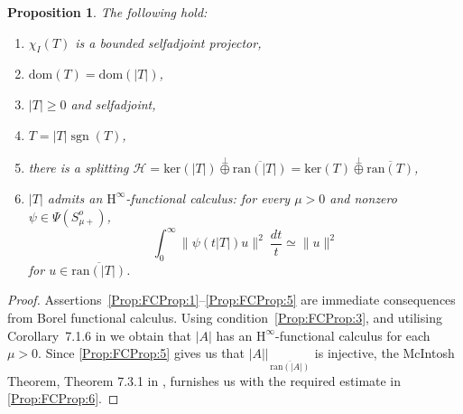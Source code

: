\documentclass[a4paper,10pt,reqno]{amsart}
\newcommand{\rest}[1]{{{\lvert_{}}_{}}_{#1}}
\newcommand{\modulus}[1]{|#1|}
\newcommand{\norm}[1]{\| #1 \|}%
\newcommand{\Hil}{\mathscr{H}}
\newcommand{\nul}{\mathrm{ker}}
\newcommand{\ran}{\mathrm{ran}}
\newcommand{\dom}{\mathrm{dom}}
\newcommand{\close}[1]{\overline{#1}}
\DeclareMathOperator{\sgn}{sgn}%
\newcommand{\Hinfty}{$\mathrm{H}^\infty$}
\newtheorem{proposition}[theorem]{Proposition}
\theoremstyle{definition}
\begin{document}
\begin{proposition}
\label{Prop:FCProp}
The following hold:
\begin{enumerate}[label=(\roman*), labelwidth=0pt, labelindent=2pt, leftmargin=21pt]
\item \label{Prop:FCProp:1}
      $\chi_{I}(T)$ is a bounded selfadjoint projector,
\item \label{Prop:FCProp:2}
      $\dom(T) = \dom(\modulus{T})$,
\item \label{Prop:FCProp:3}
      $\modulus{T} \geq 0$ and selfadjoint,
\item \label{Prop:FCProp:4}
      $T = \modulus{T}\sgn(T)$,
\item \label{Prop:FCProp:5}
      there is a splitting $\Hil = \nul(\modulus{T}) \stackrel{\perp}{\oplus} \close{\ran(\modulus{T})} = \nul(T) \stackrel{\perp}{\oplus} \close{\ran(T)}$,
\item  \label{Prop:FCProp:6}
      $\modulus{T}$ admits an \Hinfty-functional calculus: for every $\mu > 0$ and nonzero $\psi \in \Psi(S_{\mu+}^o)$,
      $$ \int_{0}^\infty \norm{\psi(t \modulus{T})u}^2\ \frac{dt}{t} \simeq \norm{u}^2$$
      for $u \in \close{\ran(\modulus{T})}$.
\end{enumerate}
\end{proposition}
\begin{proof}
Assertions~\ref{Prop:FCProp:1}--\ref{Prop:FCProp:5} are immediate consequences from Borel functional calculus.
Using condition~\ref{Prop:FCProp:3}, and utilising Corollary~7.1.6  in \cite{Haase} we obtain that $\modulus{A}$ has an \Hinfty-functional calculus for each $\mu > 0$.
Since  \ref{Prop:FCProp:5} gives us that $\modulus{A}\rest{\close{\ran(\modulus{A})}}$ is injective, the McIntosh Theorem, Theorem 7.3.1  in \cite{Haase}, furnishes us with the required estimate in \ref{Prop:FCProp:6}.
\end{proof}
\end{document}
